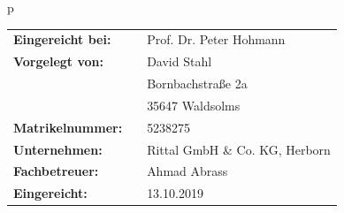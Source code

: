 \begin{center}
\begin{tabular}{p{\textwidth}}
\begin{center}
\begin{tabular}{lll}
\textbf{Eingereicht bei:} & & Prof. Dr. Peter Hohmann \\
\textbf{Vorgelegt von:} & &	David Stahl \\
& & Bornbachstraße 2a \\
& & 35647 Waldsolms \\
\textbf{Matrikelnummer:} & & 5238275 \\
\textbf{Unternehmen:} & & Rittal GmbH \& Co. KG, Herborn \\
\textbf{Fachbetreuer:} & & Ahmad Abrass \\
\textbf{Eingereicht:} & & 13.10.2019 \\
\end{tabular}
\end{center}

\end{tabular}
\end{center}